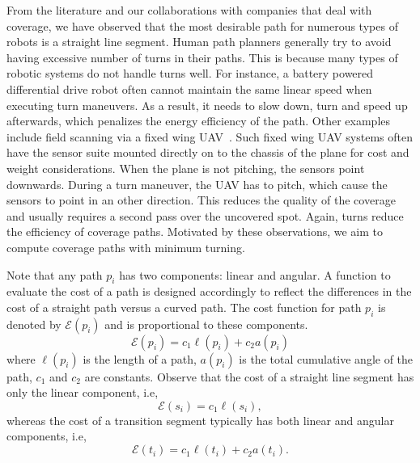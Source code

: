 \documentclass[../main.tex]{subfiles}
\begin{document}
From the literature and our collaborations with companies that deal with coverage, we have observed that the most desirable path for numerous types of robots is a straight line segment. Human path planners generally try to avoid having excessive number of turns in their paths. This is because many types of robotic systems do not handle turns well. For instance, a battery powered differential drive robot often cannot maintain the same linear speed when executing turn maneuvers. As a result, it needs to slow down, turn and speed up afterwards, which penalizes the energy efficiency of the path. Other examples include field scanning via a fixed wing UAV~\cite{frew2004vision}. Such fixed wing UAV systems often have the sensor suite mounted directly on to the chassis of the plane for cost and weight considerations. When the plane is not pitching, the sensors point downwards. During a turn maneuver, the UAV has to pitch, which cause the sensors to point in an other direction. This reduces the quality of the coverage and usually requires a second pass over the uncovered spot. Again, turns reduce the efficiency of coverage paths. Motivated by these observations, we aim to compute coverage paths with minimum turning. %

Note that any path $p_i$ has two components: linear and angular. A function to evaluate the cost of a path is designed accordingly to reflect the differences in the cost of a straight path versus a curved path. The cost function for path $p_i$ is denoted by $\mathcal{E}(p_i)$ and is proportional to these components.
\begin{equation}
	\mathcal{E}(p_i)=c_1\ell(p_i)+c_2a(p_i)
\end{equation}
where $\ell(p_i)$ is the length of a path, $a(p_i)$ is the total cumulative angle of the path, $c_1$ and $c_2$ are constants. Observe that the cost of a straight line segment has only the linear component, i.e,
\begin{equation}
	\mathcal{E}(s_i)=c_1\ell(s_i),
\end{equation}
whereas the cost of a transition segment typically has both linear and angular components, i.e,
\begin{equation}
	\mathcal{E}(t_i)=c_1\ell(t_i)+c_2a(t_i).
\end{equation}
\end{document}
